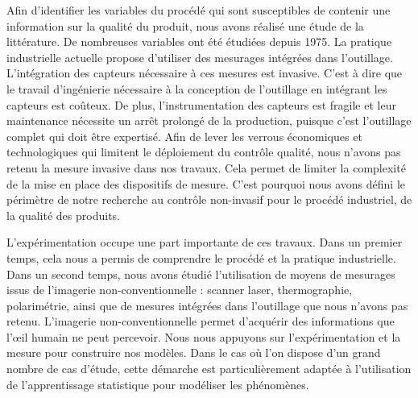 \bigskip

Afin d'identifier les variables du procédé qui sont susceptibles de contenir une information sur la qualité du produit, nous avons réalisé une étude de la littérature.
De nombreuses variables ont été étudiées depuis 1975.
La pratique industrielle actuelle propose d'utiliser des mesurages intégrées dans l'outillage.
L'intégration des capteurs nécessaire à ces mesures est invasive.
C'est à dire que le travail d'ingénierie nécessaire à la conception de l'outillage en intégrant les capteurs est coûteux.
De plus, l'instrumentation des capteurs est fragile et leur maintenance nécessite un arrêt prolongé de la production, puisque c'est l'outillage complet qui doit être expertisé.
Afin de lever les verrous économiques et technologiques qui limitent le déploiement du contrôle qualité, nous n'avons pas retenu la mesure invasive dans nos travaux.
Cela permet de limiter la complexité de la mise en place des dispositifs de mesure.
C'est pourquoi nous avons défini le périmètre de notre recherche au contrôle non-invasif pour le procédé industriel, de la qualité des produits.

L'expérimentation occupe une part importante de ces travaux.
Dans un premier temps, cela nous a permis de comprendre le procédé et la pratique industrielle.
Dans un second temps, nous avons étudié l'utilisation de moyens de mesurages issus de l'imagerie non-conventionnelle : scanner laser, thermographie, polarimétrie, ainsi que de mesures intégrées dans l'outillage que nous n'avons pas retenu.
L'imagerie non-conventionnelle permet d'acquérir des informations que l'œil humain ne peut percevoir. %
Nous nous appuyons sur l'expérimentation et la mesure pour construire nos modèles.  %
Dans le cas où l'on dispose d'un grand nombre de cas d'étude, cette démarche est particulièrement adaptée à l'utilisation de l'apprentissage statistique pour modéliser les phénomènes.

